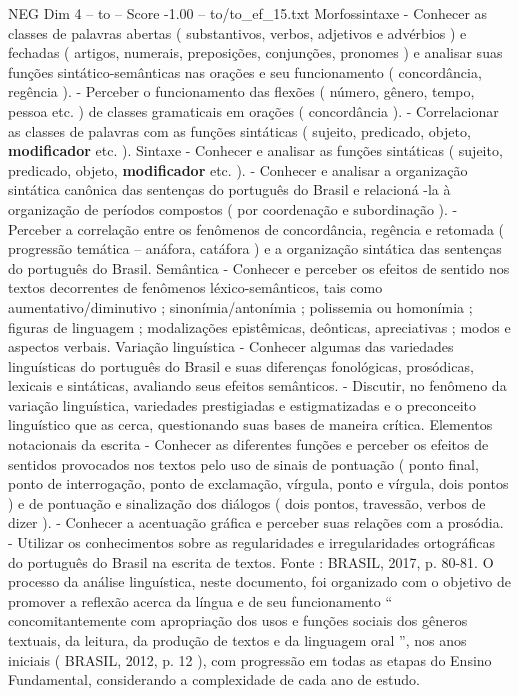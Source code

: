 \begin{textsample}{NEG Dim 4 – to – Score -1.00 – to/to\_ef\_15.txt}
Morfossintaxe - Conhecer as classes de palavras abertas ( substantivos, verbos, adjetivos e advérbios ) e fechadas ( artigos, numerais, preposições, conjunções, pronomes ) e analisar suas funções sintático-semânticas nas orações e seu funcionamento ( concordância, regência ). - Perceber o funcionamento das flexões ( número, gênero, tempo, pessoa etc. ) de classes gramaticais em orações ( concordância ). - Correlacionar as classes de palavras com as funções sintáticas ( sujeito, predicado, objeto, \textbf{modificador} etc. ).
Sintaxe - Conhecer e analisar as funções sintáticas ( sujeito, predicado, objeto, \textbf{modificador} etc. ). - Conhecer e analisar a organização sintática canônica das sentenças do português do Brasil e relacioná -la à organização de períodos compostos ( por coordenação e subordinação ). - Perceber a correlação entre os fenômenos de concordância, regência e retomada ( progressão temática – anáfora, catáfora ) e a organização sintática das sentenças do português do Brasil.
Semântica - Conhecer e perceber os efeitos de sentido nos textos decorrentes de fenômenos léxico-semânticos, tais como aumentativo/diminutivo ; sinonímia/antonímia ; polissemia ou homonímia ; figuras de linguagem ; modalizações epistêmicas, deônticas, apreciativas ; modos e aspectos verbais.
Variação linguística - Conhecer algumas das variedades linguísticas do português do Brasil e suas diferenças fonológicas, prosódicas, lexicais e sintáticas, avaliando seus efeitos semânticos. - Discutir, no fenômeno da variação linguística, variedades prestigiadas e estigmatizadas e o preconceito linguístico que as cerca, questionando suas bases de maneira crítica.
Elementos notacionais da escrita - Conhecer as diferentes funções e perceber os efeitos de sentidos provocados nos textos pelo uso de sinais de pontuação ( ponto final, ponto de interrogação, ponto de exclamação, vírgula, ponto e vírgula, dois pontos ) e de pontuação e sinalização dos diálogos ( dois pontos, travessão, verbos de dizer ). - Conhecer a acentuação gráfica e perceber suas relações com a prosódia. - Utilizar os conhecimentos sobre as regularidades e irregularidades ortográficas do português do Brasil na escrita de textos.
Fonte : BRASIL, 2017, p. 80-81.
O processo da análise linguística, neste documento, foi organizado com o objetivo de promover a reflexão acerca da língua e de seu funcionamento “ concomitantemente com apropriação dos usos e funções sociais dos gêneros textuais, da leitura, da produção de textos e da linguagem oral ”, nos anos iniciais ( BRASIL, 2012, p. 12 ), com progressão em todas as etapas do Ensino Fundamental, considerando a complexidade de cada ano de estudo.

\end{textsample}
